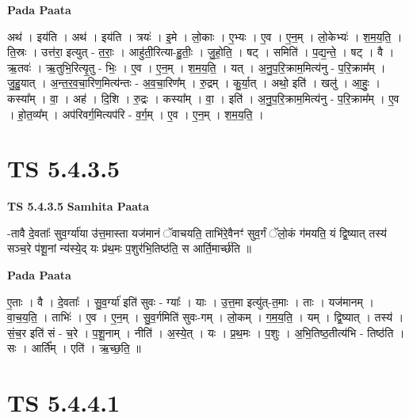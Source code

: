 \documentclass[17pt]{extarticle}
\begin{document}
\textbf{Pada Paata} \newline

अथ॑ । इय॑ति । अथ॑ । इय॑ति । त्रयः॑ । इ॒मे । लो॒काः । ए॒भ्यः । ए॒व । ए॒न॒म् । लो॒केभ्यः॑ । श॒म॒य॒ति॒ । ति॒स्रः । उत्त॑रा॒ इत्युत् - त॒राः॒ । आहु॑ती॒रित्या-हु॒तीः॒ । जु॒हो॒ति॒ । षट् । समिति॑ । प॒द्य॒न्ते॒ । षट् । वै । ऋ॒तवः॑ । ऋ॒तुभि॒रित्यृ॒तु - भिः॒ । ए॒व । ए॒न॒म् । श॒म॒य॒ति॒ । यत् । अ॒नु॒प॒रि॒क्राम॒मित्य॑नु - प॒रि॒क्राम᳚म् । जु॒हु॒यात् । अ॒न्त॒र॒व॒चा॒रिण॒मित्य॑न्तः - अ॒व॒चा॒रिण᳚म् । रु॒द्रम् । कु॒र्या॒त् । अथो॒ इति॑ । खलु॑ । आ॒हुः॒ । कस्या᳚म् । वा॒ । अह॑ । दि॒शि । रु॒द्रः । कस्या᳚म् । वा॒ । इति॑ । अ॒नु॒प॒रि॒क्राम॒मित्य॑नु - प॒रि॒क्राम᳚म् । ए॒व । हो॒त॒व्य᳚म् । अप॑रिवर्ग॒मित्यप॑रि - व॒र्ग॒म् । ए॒व । ए॒न॒म् । श॒म॒य॒ति॒ ।  \newline




\section*{ TS 5.4.3.5 }

\textbf{TS 5.4.3.5 } \newline
\textbf{Samhita Paata} \newline

-तावै दे॒वताः᳚ सुव॒र्ग्या॑या उ॑त्त॒मास्ता यज॑मानं ॅवाचयति॒ ताभि॑रे॒वैनꣳ॑ सुव॒र्गं ॅलो॒कं ग॑मयति॒ यं द्वि॒ष्यात् तस्य॑ सञ्च॒रे प॑शू॒नां न्य॑स्ये॒द् यः प्र॑थ॒मः प॒शुर॑भि॒तिष्ठ॑ति॒ स आर्ति॒मार्च्छ॑ति ॥ \newline

\textbf{Pada Paata} \newline

ए॒ताः । वै । दे॒वताः᳚ । सु॒व॒र्ग्या॑ इति॑ सुवः - ग्याः᳚ । याः । उ॒त्त॒मा इत्यु॑त्-त॒माः । ताः । यज॑मानम् । वा॒च॒य॒ति॒ । ताभिः॑ । ए॒व । ए॒न॒म् । सु॒व॒र्गमिति॑ सुवः-गम् । लो॒कम् । ग॒म॒य॒ति॒ । यम् । द्वि॒ष्यात् । तस्य॑ । सं॒च॒र इति॑ सं - च॒रे । प॒शू॒नाम् । नीति॑ । अ॒स्ये॒त् । यः । प्र॒थ॒मः । प॒शुः । अ॒भि॒तिष्ठ॒तीत्य॑भि - तिष्ठ॑ति । सः । आर्ति᳚म् । एति॑ । ऋ॒च्छ॒ति॒ ॥  \newline




\section*{ TS 5.4.4.1 }
\end{document}
